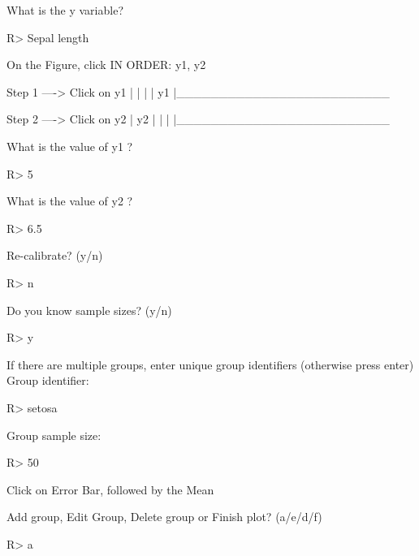 \documentclass[12pt]{article}
\begin{document}
\begin{CodeChunk}
\begin{CodeOutput}
What is the y variable? 
\end{CodeOutput}
\begin{CodeInput}
R> Sepal length
\end{CodeInput}
\begin{CodeOutput}
On the Figure, click IN ORDER: 
      y1, y2  


    Step 1 ----> Click on y1
  |
  |
  |
  |
  y1
  |_________________________


    Step 2 ----> Click on y2
  |
  y2
  |
  |
  |
  |_________________________
  
What is the value of y1 ?
\end{CodeOutput}
\begin{CodeInput}
R> 5
\end{CodeInput}
\begin{CodeOutput}
What is the value of y2 ?
\end{CodeOutput}
\begin{CodeInput}
R> 6.5
\end{CodeInput}
\begin{CodeOutput}
Re-calibrate? (y/n) 
\end{CodeOutput}
\begin{CodeInput}
R> n
\end{CodeInput}
\begin{CodeOutput}
Do you know sample sizes? (y/n)  
\end{CodeOutput}
\begin{CodeInput}
R> y
\end{CodeInput}
\begin{CodeOutput}
If there are multiple groups, enter unique group identifiers (otherwise press enter)
Group identifier: 
\end{CodeOutput}
\begin{CodeInput}
R> setosa
\end{CodeInput}
\begin{CodeOutput}
Group sample size: 
\end{CodeOutput}
\begin{CodeInput}
R> 50
\end{CodeInput}
\begin{CodeOutput}
Click on Error Bar, followed by the Mean

Add group, Edit Group, Delete group or Finish plot? (a/e/d/f) 
\end{CodeOutput}
\begin{CodeInput}
R> a
\end{CodeInput}
\end{CodeChunk}
\end{document}
